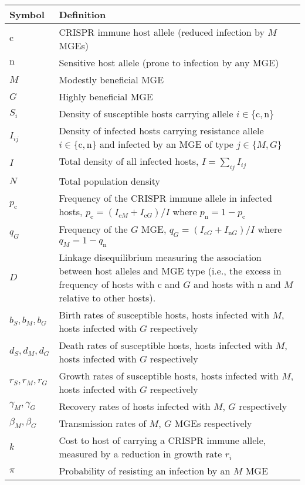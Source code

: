 \documentclass{article}
\newcommand{\badFGE}{M}
\newcommand{\goodFGE}{G}
\newcommand{\sensitive}{\mathrm{n}}
\newcommand{\immune}{\mathrm{c}}
\begin{document}
\begin{table}
    \begin{center}
        \begin{tabular}{p{2cm}p{10cm}}
\hline 
Symbol & Definition\tabularnewline
\hline 
    $\immune$ & CRISPR immune host allele (reduced infection by $\badFGE$ MGEs) \tabularnewline
    $\sensitive$ & Sensitive host allele (prone to infection by any MGE) \tabularnewline
    $\badFGE$ & Modestly beneficial MGE \tabularnewline
    $\goodFGE$ & Highly beneficial MGE \tabularnewline
    $S_{i}$ & Density of susceptible hosts carrying allele $i \in \{\immune,\sensitive\}$ \tabularnewline
    $I_{ij}$ & Density of infected hosts carrying resistance allele $i \in \{\immune,\sensitive\}$ and infected by an MGE of type $j \in \{\badFGE,\goodFGE\}$  \tabularnewline 
    $I$ & Total density of all infected hosts, $I = \sum_{ij} I_{ij}$   \tabularnewline 
    $N$ & Total population density \tabularnewline 
            $p_{\immune}$ & Frequency of the CRISPR immune allele in infected hosts, $p_{\immune} = (I_{\immune \badFGE} + I_{\immune \goodFGE})/I$ where $p_{\sensitive} = 1-p_{\immune}$ \tabularnewline
            $q_{\goodFGE}$ & Frequency of the $\goodFGE$ MGE, $q_{\goodFGE} = (I_{\immune \goodFGE} + I_{\sensitive \goodFGE})/I$ where $q_{\badFGE} = 1 - q_{\sensitive}$ \tabularnewline
            $D$ & Linkage disequilibrium measuring the association between host alleles and MGE type (i.e., the excess in frequency of hosts with $\immune$ and $\goodFGE$ and hosts with $\sensitive$ and $\badFGE$ relative to other hosts). \tabularnewline
            $b_{S}, b_{\badFGE}, b_{\goodFGE}$ & Birth rates of susceptible hosts, hosts infected with $\badFGE$, hosts infected with $\goodFGE$ respectively \tabularnewline
            $d_{S}, d_{\badFGE}, d_{\goodFGE}$ & Death rates of susceptible hosts, hosts infected with $\badFGE$, hosts infected with $\goodFGE$ respectively \tabularnewline
            $r_{S}, r_{\badFGE}, r_{\goodFGE}$ & Growth rates of susceptible hosts, hosts infected with $\badFGE$, hosts infected with $\goodFGE$ respectively \tabularnewline 
            $\gamma_{\badFGE}, \gamma_{\goodFGE}$ & Recovery rates of hosts infected with $\badFGE$, $\goodFGE$ respectively \tabularnewline
            $\beta_{\badFGE}, \beta_{\goodFGE}$ & Transmission rates of $\badFGE$, $\goodFGE$ MGEs respectively \tabularnewline
            $k$ & Cost to host of carrying a CRISPR immune allele, measured by a reduction in growth rate $r_{i}$ \tabularnewline
            $\pi$ & Probability of resisting an infection by an $\badFGE$ MGE \tabularnewline
            \hline 
\end{tabular}
\caption{\label{tab:notation}}
    \end{center}
\end{table}
\end{document}
